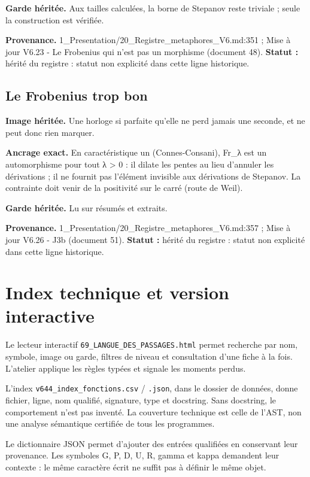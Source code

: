 \documentclass[
  9pt,
  a4paper,
]{article}
\begin{document}
\textbf{Garde héritée.} Aux tailles calculées, la borne de Stepanov
reste triviale ; seule la construction est vérifiée.

\textbf{Provenance.} 1\_Presentation/20\_Registre\_metaphores\_V6.md:351
; Mise à jour V6.23 - Le Frobenius qui n'est pas un morphisme (document
48). \textbf{Statut :} hérité du registre : statut non explicité dans
cette ligne historique.

\hypertarget{le-frobenius-trop-bon}{%
\subsection{Le Frobenius trop bon}\label{le-frobenius-trop-bon}}

\textbf{Image héritée.} Une horloge si parfaite qu'elle ne perd jamais
une seconde, et ne peut donc rien marquer.

\textbf{Ancrage exact.} En caractéristique un (Connes-Consani), Fr\_λ
est un automorphisme pour tout λ \textgreater{} 0 : il dilate les pentes
au lieu d'annuler les dérivations ; il ne fournit pas l'élément
invisible aux dérivations de Stepanov. La contrainte doit venir de la
positivité sur le carré (route de Weil).

\textbf{Garde héritée.} Lu sur résumés et extraits.

\textbf{Provenance.} 1\_Presentation/20\_Registre\_metaphores\_V6.md:357
; Mise à jour V6.26 - J3b (document 51). \textbf{Statut :} hérité du
registre : statut non explicité dans cette ligne historique.

\hypertarget{index-technique-et-version-interactive}{%
\section{Index technique et version
interactive}\label{index-technique-et-version-interactive}}

Le lecteur interactif \texttt{69\_LANGUE\_DES\_PASSAGES.html} permet
recherche par nom, symbole, image ou garde, filtres de niveau et
consultation d'une fiche à la fois. L'atelier applique les règles typées
et signale les moments perdus.

L'index \texttt{v644\_index\_fonctions.csv} / \texttt{.json}, dans le
dossier de données, donne fichier, ligne, nom qualifié, signature, type
et docstring. Sans docstring, le comportement n'est pas inventé. La
couverture technique est celle de l'AST, non une analyse sémantique
certifiée de tous les programmes.

Le dictionnaire JSON permet d'ajouter des entrées qualifiées en
conservant leur provenance. Les symboles G, P, D, U, R, gamma et kappa
demandent leur contexte : le même caractère écrit ne suffit pas à
définir le même objet.
\end{document}

